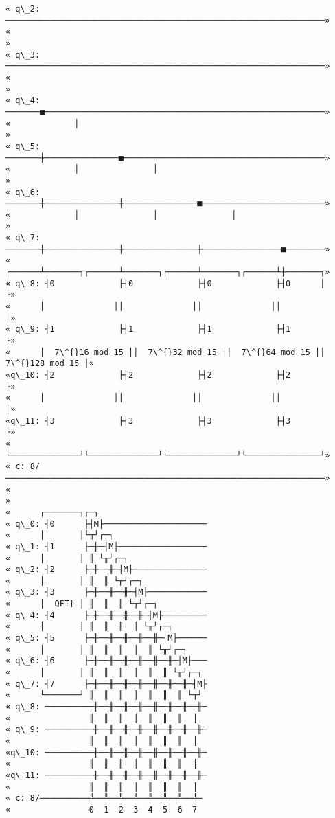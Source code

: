 \documentclass[11pt]{article}
\begin{document}
\begin{tcolorbox}[breakable, size=fbox, boxrule=.5pt, pad at break*=1mm, opacityfill=0]
\begin{Verbatim}[commandchars=\\\{\}]
« q\_2: ─────────────────────────────────────────────────────────────────»
«                                                                       »
« q\_3: ─────────────────────────────────────────────────────────────────»
«                                                                       »
« q\_4: ───────■─────────────────────────────────────────────────────────»
«             │                                                         »
« q\_5: ───────┼───────────────■─────────────────────────────────────────»
«             │               │                                         »
« q\_6: ───────┼───────────────┼───────────────■─────────────────────────»
«             │               │               │                         »
« q\_7: ───────┼───────────────┼───────────────┼────────────────■────────»
«      ┌──────┴───────┐┌──────┴───────┐┌──────┴───────┐┌──────┴┼───────┐»
« q\_8: ┤0             ├┤0             ├┤0             ├┤0      │       ├»
«      │              ││              ││              ││               │»
« q\_9: ┤1             ├┤1             ├┤1             ├┤1              ├»
«      │  7\^{}16 mod 15 ││  7\^{}32 mod 15 ││  7\^{}64 mod 15 ││  7\^{}128 mod 15 │»
«q\_10: ┤2             ├┤2             ├┤2             ├┤2              ├»
«      │              ││              ││              ││               │»
«q\_11: ┤3             ├┤3             ├┤3             ├┤3              ├»
«      └──────────────┘└──────────────┘└──────────────┘└───────────────┘»
« c: 8/═════════════════════════════════════════════════════════════════»
«                                                                       »
«      ┌───────┐┌─┐
« q\_0: ┤0      ├┤M├─────────────────────
«      │       │└╥┘┌─┐
« q\_1: ┤1      ├─╫─┤M├──────────────────
«      │       │ ║ └╥┘┌─┐
« q\_2: ┤2      ├─╫──╫─┤M├───────────────
«      │       │ ║  ║ └╥┘┌─┐
« q\_3: ┤3      ├─╫──╫──╫─┤M├────────────
«      │  QFT† │ ║  ║  ║ └╥┘┌─┐
« q\_4: ┤4      ├─╫──╫──╫──╫─┤M├─────────
«      │       │ ║  ║  ║  ║ └╥┘┌─┐
« q\_5: ┤5      ├─╫──╫──╫──╫──╫─┤M├──────
«      │       │ ║  ║  ║  ║  ║ └╥┘┌─┐
« q\_6: ┤6      ├─╫──╫──╫──╫──╫──╫─┤M├───
«      │       │ ║  ║  ║  ║  ║  ║ └╥┘┌─┐
« q\_7: ┤7      ├─╫──╫──╫──╫──╫──╫──╫─┤M├
«      └───────┘ ║  ║  ║  ║  ║  ║  ║ └╥┘
« q\_8: ──────────╫──╫──╫──╫──╫──╫──╫──╫─
«                ║  ║  ║  ║  ║  ║  ║  ║
« q\_9: ──────────╫──╫──╫──╫──╫──╫──╫──╫─
«                ║  ║  ║  ║  ║  ║  ║  ║
«q\_10: ──────────╫──╫──╫──╫──╫──╫──╫──╫─
«                ║  ║  ║  ║  ║  ║  ║  ║
«q\_11: ──────────╫──╫──╫──╫──╫──╫──╫──╫─
«                ║  ║  ║  ║  ║  ║  ║  ║
« c: 8/══════════╩══╩══╩══╩══╩══╩══╩══╩═
«                0  1  2  3  4  5  6  7
\end{Verbatim}
\end{tcolorbox}
        
\end{document}
